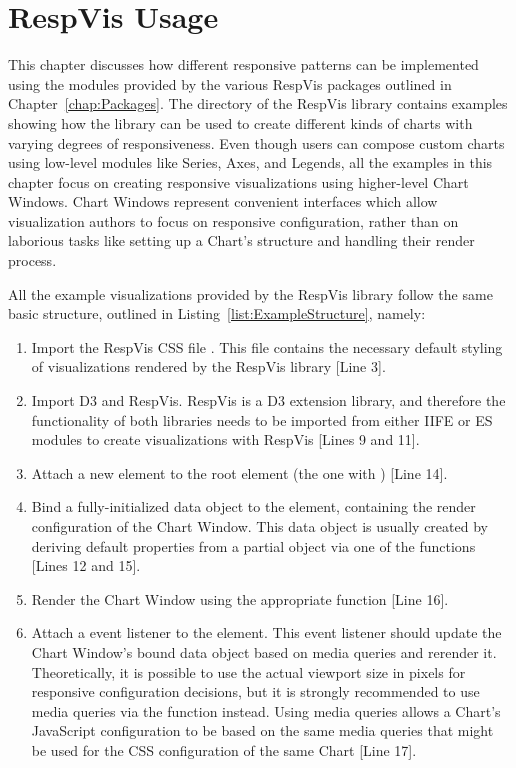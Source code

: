 \chapter{RespVis Usage}
\label{chap:Usage}

This chapter discusses how different responsive patterns can be
implemented using the modules provided by the various RespVis packages
outlined in Chapter~\ref{chap:Packages}. The 
directory of the RespVis library contains examples showing how the
library can be used to create different kinds of charts with varying
degrees of responsiveness. Even though users can compose custom charts
using low-level modules like Series, Axes, and Legends, all the
examples in this chapter focus on creating responsive visualizations
using higher-level Chart Windows. Chart Windows represent convenient
interfaces which allow visualization authors to focus on responsive
configuration, rather than on laborious tasks like setting up a
Chart's structure and handling their render process.

All the example visualizations provided by the RespVis library follow
the same basic structure, outlined in
Listing~\ref{list:ExampleStructure}, namely:
\begin{enumerate}
\item Import the RespVis CSS file . This file
  contains the necessary default styling of visualizations rendered by
  the RespVis library [Line 3].

\item Import D3 and RespVis. RespVis is a D3 extension library, and
  therefore the functionality of both libraries needs to be imported
  from either IIFE or ES modules to create visualizations with
  RespVis [Lines 9 and 11].

\item Attach a new  element to the root 
  element (the one with ) [Line 14].

\item Bind a fully-initialized data object to the  element,
  containing the render configuration of the Chart Window. This data
  object is usually created by deriving default properties from a
  partial object via one of the  functions [Lines 12 and 15].

\item Render the Chart Window using the appropriate
   function [Line 16].

\item Attach a  event listener to the 
  element. This event listener should update the Chart Window's bound
  data object based on media queries and rerender it. Theoretically,
  it is possible to use the actual viewport size in pixels for
  responsive configuration decisions, but it is strongly recommended
  to use media queries via the  function
  instead. Using media queries allows a Chart's JavaScript
  configuration to be based on the same media queries that might be
  used for the CSS configuration of the same Chart [Line 17].
\end{enumerate}



